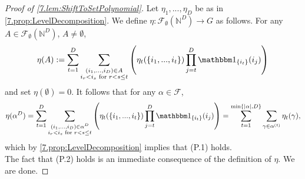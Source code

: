 \documentclass[11pt,american,preprint]{elsarticle}
\numberwithin{equation}{section}
\theoremstyle{plain}
\theoremstyle{plain*}
\theoremstyle{plain}
\theoremstyle{plain*}
\theoremstyle{plain}
\theoremstyle{plain*}
\theoremstyle{remark}
\theoremstyle{remark*}
\theoremstyle{remark}
\theoremstyle{remark*}
\theoremstyle{remark}
\theoremstyle{remark*}
\theoremstyle{plain}
\theoremstyle{definition}
\theoremstyle{plain}
\theoremstyle{plain} %
\newcommand{\N}{\mathbb{N}}
\begin{document}
\begin{proof}[Proof of \cref{7.lem:ShiftToSetPolynomial}]
    Let $\eta_1,...,\eta_D$ be as in \cref{7.prop:LevelDecomposition}. We define $\eta:\mathcal F_\emptyset (\N^D)\rightarrow G$ as follows.
For any $A\in\mathcal F_\emptyset (\N^D)$, $A\neq \emptyset$,
$$\eta(A):=\sum_{t=1}^D\sum_{\substack{(i_1,...,i_D)\in A\\i_r< i_s\text{ for }r<s\leq t}}\left(\eta_t(\{i_1,...,i_t\})\prod_{j=t}^D\mathbbm 1_{\{i_t\}}(i_j)\right)$$
and set $\eta(\emptyset)=0$.
It follows that for any $\alpha\in\mathcal F$,   
\begin{equation*}
\eta(\alpha^D)=\sum_{t=1}^D\sum_{\substack{(i_1,...,i_D)\in \alpha^D\\i_r< i_s\text{ for }r<s\leq t}}\left(\eta_t(\{i_1,...,i_t\})\prod_{j=t}^D\mathbbm 1_{\{i_t\}}(i_j)\right)
=\sum_{t=1}^{\min\{|\alpha|,D\}}\sum_{\gamma\in\alpha^{(t)}}\eta_t(\gamma),
\end{equation*}
which by \cref{7.prop:LevelDecomposition} implies that (P.1) holds.\\
The fact that  (P.2) holds is an immediate consequence of the definition of $\eta$. We are done.
\end{proof}


 
\end{document}
